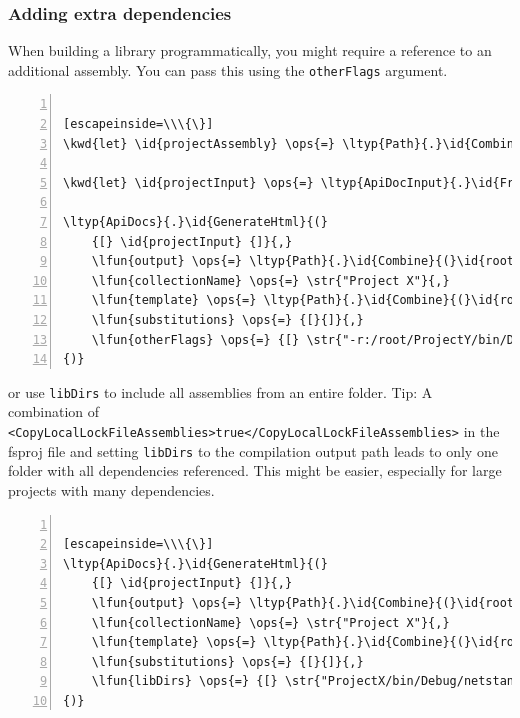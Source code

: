 \documentclass{article}
\newcommand{\id}[1]{\textcolor{black}{#1}}
\newcommand{\kwd}[1]{\textcolor{navy}{#1}}
\newcommand{\ops}[1]{\textcolor{purple}{#1}}
\newcommand{\str}[1]{\textcolor{olive}{#1}}
\begin{document}
\subsubsection*{Adding extra dependencies}



When building a library programmatically, you might require a reference to an additional assembly.
You can pass this using the \texttt{otherFlags} argument.
\begin{lstlisting}[numbers=left]

[escapeinside=\\\{\}]
\kwd{let} \id{projectAssembly} \ops{=} \ltyp{Path}{.}\id{Combine}{(}\id{root}{,} \str{"bin/X.dll"}{)}

\kwd{let} \id{projectInput} \ops{=} \ltyp{ApiDocInput}{.}\id{FromFile}{(}\id{projectAssembly}{)}

\ltyp{ApiDocs}{.}\id{GenerateHtml}{(}
    {[} \id{projectInput} {]}{,}
    \lfun{output} \ops{=} \ltyp{Path}{.}\id{Combine}{(}\id{root}{,} \str{"output"}{)}{,}
    \lfun{collectionName} \ops{=} \str{"Project X"}{,}
    \lfun{template} \ops{=} \ltyp{Path}{.}\id{Combine}{(}\id{root}{,} \str{"templates"}{,} \str{"template.html"}{)}{,}
    \lfun{substitutions} \ops{=} {[}{]}{,}
    \lfun{otherFlags} \ops{=} {[} \str{"-r:/root/ProjectY/bin/Debug/net6.0/Y.dll"} {]}
{)}

\end{lstlisting}



or use \texttt{libDirs} to include all assemblies from an entire folder.
Tip: A combination of \texttt{<CopyLocalLockFileAssemblies>true</CopyLocalLockFileAssemblies>} in the fsproj file and setting \texttt{libDirs} to the compilation output path leads to only one folder with all dependencies referenced.
This might be easier, especially for large projects with many dependencies.
\begin{lstlisting}[numbers=left]

[escapeinside=\\\{\}]
\ltyp{ApiDocs}{.}\id{GenerateHtml}{(}
    {[} \id{projectInput} {]}{,}
    \lfun{output} \ops{=} \ltyp{Path}{.}\id{Combine}{(}\id{root}{,} \str{"output"}{)}{,}
    \lfun{collectionName} \ops{=} \str{"Project X"}{,}
    \lfun{template} \ops{=} \ltyp{Path}{.}\id{Combine}{(}\id{root}{,} \str{"templates"}{,} \str{"template.html"}{)}{,}
    \lfun{substitutions} \ops{=} {[}{]}{,}
    \lfun{libDirs} \ops{=} {[} \str{"ProjectX/bin/Debug/netstandard2.0"} {]}
{)}

\end{lstlisting}
\end{document}
